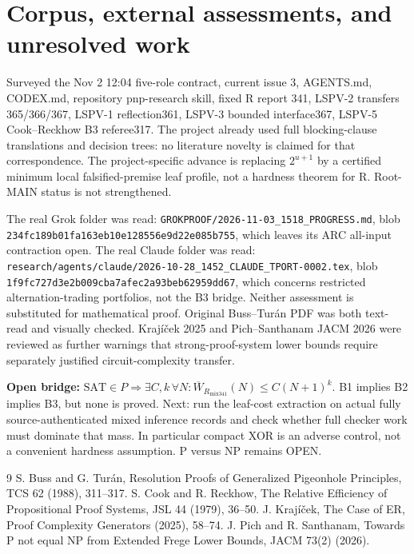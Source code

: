 \documentclass[11pt]{article}
\begin{document}
\section*{Corpus, external assessments, and unresolved work}
Surveyed the Nov 2 12:04 five-role contract, current issue 3, AGENTS.md, CODEX.md, repository pnp-research skill, fixed R report 341, LSPV-2 transfers 365/366/367, LSPV-1 reflection361, LSPV-3 bounded interface367, LSPV-5 Cook--Reckhow B3 referee317. The project already used full blocking-clause translations and decision trees: no literature novelty is claimed for that correspondence. The project-specific advance is replacing $2^{u+1}$ by a certified minimum local falsified-premise leaf profile, not a hardness theorem for R. Root-MAIN status is not strengthened.

The real Grok folder was read: \texttt{GROKPROOF/2026-11-03\_1518\_PROGRESS.md}, blob \texttt{234fc189b01fa163eb10e128556e9d22e085b755}, which leaves its ARC all-input contraction open. The real Claude folder was read: \texttt{research/agents/claude/2026-10-28\_1452\_CLAUDE\_TPORT-0002.tex}, blob \texttt{1f9fc727d3e2b009cba7afec2a93beb62959dd67}, which concerns restricted alternation-trading portfolios, not the B3 bridge. Neither assessment is substituted for mathematical proof. Original Buss--Tur\'an PDF was both text-read and visually checked. Kraj\'i\v{c}ek 2025 and Pich--Santhanam JACM 2026 were reviewed as further warnings that strong-proof-system lower bounds require separately justified circuit-complexity transfer.

\noindent\textbf{Open bridge:} $\mathrm{SAT}\in P\Rightarrow \exists C,k\,\forall N:\overline W_{R_{\mathrm{mix341}}}(N)\le C(N+1)^k$. B1 implies B2 implies B3, but none is proved. Next: run the leaf-cost extraction on actual fully source-authenticated mixed inference records and check whether full checker work must dominate that mass. In particular compact XOR is an adverse control, not a convenient hardness assumption. P versus NP remains OPEN.
\begin{thebibliography}{9}
 S. Buss and G. Tur\'an, Resolution Proofs of Generalized Pigeonhole Principles, TCS 62 (1988), 311--317.
 S. Cook and R. Reckhow, The Relative Efficiency of Propositional Proof Systems, JSL 44 (1979), 36--50.
 J. Kraj\'i\v{c}ek, The Case of ER, Proof Complexity Generators (2025), 58--74.
 J. Pich and R. Santhanam, Towards P not equal NP from Extended Frege Lower Bounds, JACM 73(2) (2026).
\end{thebibliography}
\end{document}
